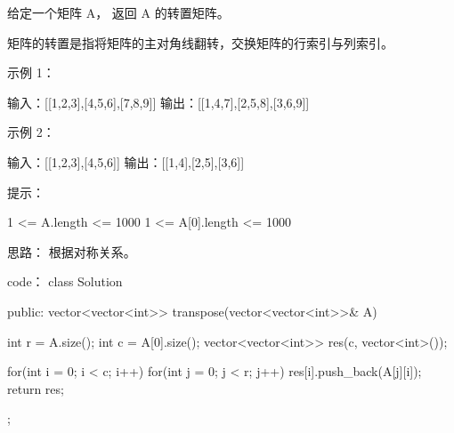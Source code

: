 给定一个矩阵 A， 返回 A 的转置矩阵。

矩阵的转置是指将矩阵的主对角线翻转，交换矩阵的行索引与列索引。

 

示例 1：

输入：[[1,2,3],[4,5,6],[7,8,9]]
输出：[[1,4,7],[2,5,8],[3,6,9]]

示例 2：

输入：[[1,2,3],[4,5,6]]
输出：[[1,4],[2,5],[3,6]]

 

提示：

    1 <= A.length <= 1000
    1 <= A[0].length <= 1000



















思路：
根据对称关系。





















code：
class Solution {
public:
    vector<vector<int>> transpose(vector<vector<int>>& A) {
        int r = A.size();
        int c = A[0].size();
        vector<vector<int>> res(c, vector<int>());
        
        for(int i = 0; i < c; i++)
        {
            for(int j = 0; j < r; j++)
            {
                res[i].push_back(A[j][i]);
            }
        }
        return res;
    }
};